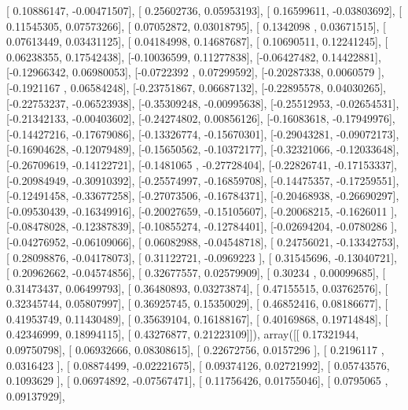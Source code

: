 \documentclass{article}
\begin{document}
       [ 0.10886147, -0.00471507],
       [ 0.25602736,  0.05953193],
       [ 0.16599611, -0.03803692],
       [ 0.11545305,  0.07573266],
       [ 0.07052872,  0.03018795],
       [ 0.1342098 ,  0.03671515],
       [ 0.07613449,  0.03431125],
       [ 0.04184998,  0.14687687],
       [ 0.10690511,  0.12241245],
       [ 0.06238355,  0.17542438],
       [-0.10036599,  0.11277838],
       [-0.06427482,  0.14422881],
       [-0.12966342,  0.06980053],
       [-0.0722392 ,  0.07299592],
       [-0.20287338,  0.0060579 ],
       [-0.1921167 ,  0.06584248],
       [-0.23751867,  0.06687132],
       [-0.22895578,  0.04030265],
       [-0.22753237, -0.06523938],
       [-0.35309248, -0.00995638],
       [-0.25512953, -0.02654531],
       [-0.21342133, -0.00403602],
       [-0.24274802,  0.00856126],
       [-0.16083618, -0.17949976],
       [-0.14427216, -0.17679086],
       [-0.13326774, -0.15670301],
       [-0.29043281, -0.09072173],
       [-0.16904628, -0.12079489],
       [-0.15650562, -0.10372177],
       [-0.32321066, -0.12033648],
       [-0.26709619, -0.14122721],
       [-0.1481065 , -0.27728404],
       [-0.22826741, -0.17153337],
       [-0.20984949, -0.30910392],
       [-0.25574997, -0.16859708],
       [-0.14475357, -0.17259551],
       [-0.12491458, -0.33677258],
       [-0.27073506, -0.16784371],
       [-0.20468938, -0.26690297],
       [-0.09530439, -0.16349916],
       [-0.20027659, -0.15105607],
       [-0.20068215, -0.1626011 ],
       [-0.08478028, -0.12387839],
       [-0.10855274, -0.12784401],
       [-0.02694204, -0.0780286 ],
       [-0.04276952, -0.06109066],
       [ 0.06082988, -0.04548718],
       [ 0.24756021, -0.13342753],
       [ 0.28098876, -0.04178073],
       [ 0.31122721, -0.0969223 ],
       [ 0.31545696, -0.13040721],
       [ 0.20962662, -0.04574856],
       [ 0.32677557,  0.02579909],
       [ 0.30234   ,  0.00099685],
       [ 0.31473437,  0.06499793],
       [ 0.36480893,  0.03273874],
       [ 0.47155515,  0.03762576],
       [ 0.32345744,  0.05807997],
       [ 0.36925745,  0.15350029],
       [ 0.46852416,  0.08186677],
       [ 0.41953749,  0.11430489],
       [ 0.35639104,  0.16188167],
       [ 0.40169868,  0.19714848],
       [ 0.42346999,  0.18994115],
       [ 0.43276877,  0.21223109]]), array([[ 0.17321944,  0.09750798],
       [ 0.06932666,  0.08308615],
       [ 0.22672756,  0.0157296 ],
       [ 0.2196117 ,  0.0316423 ],
       [ 0.08874499, -0.02221675],
       [ 0.09374126,  0.02721992],
       [ 0.05743576,  0.1093629 ],
       [ 0.06974892, -0.07567471],
       [ 0.11756426,  0.01755046],
       [ 0.0795065 ,  0.09137929],
\end{document}
